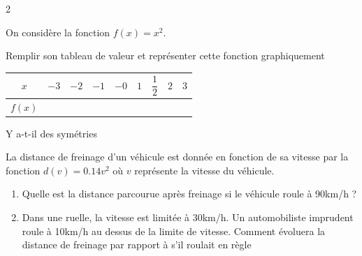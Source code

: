 \documentclass[10pt,a4paper]{article}
\begin{document}
\begin{multicols}{2}

    \begin{exo}[][]

        On considère la fonction \(f(x) = x^2\).

        Remplir son tableau de valeur et représenter cette fonction graphiquement
        
        \begin{center}
            \setlength{\tabcolsep}{8pt}
            \renewcommand{\arraystretch}{2}
            \begin{tabular}{|*{9}{c|}}
                \hline
                \(x\) & \(-3\) & \(-2\) & \(-1\) & \(-0\)& \(1\) & \(\dfrac{1}{2}\)  & \(2\)& \(3\)
                \\
                \hline
                \(f(x)\) &&&&&&&& \\ \hline
            \end{tabular}
        \end{center}


        Y a-t-il des symétries
    \end{exo}


        \begin{exo}[][appro]
        La distance de freinage d'un véhicule est donnée en fonction de sa vitesse par la fonction \(d(v) = 0.14v^2\) où \(v\) représente la vitesse du véhicule. 
        \begin{enumerate}
            \item Quelle est la distance parcourue après freinage si le véhicule roule à 90km/h ?
            \item Dans une ruelle, la vitesse est limitée à 30km/h. Un automobiliste imprudent roule à 10km/h au dessus de la limite de vitesse. Comment évoluera la distance de freinage par rapport à s'il roulait en règle
        \end{enumerate}
    \end{exo}


\end{multicols}
\end{document}
